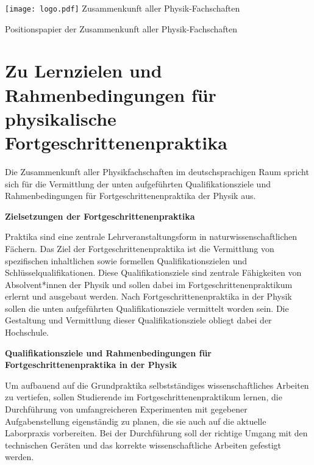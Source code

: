 ﻿\documentclass[DIV=calc]{scrartcl}
\begin{document}
    \hspace{0.87\textwidth}
    \begin{minipage}{120pt}
        \vspace{-1.8cm}
        \texttt{[image: logo.pdf]}
        \centering
        \small Zusammenkunft aller Physik-Fachschaften
    \end{minipage}
    \begin{center}
        \huge{Positionspapier der Zusammenkunft aller Physik-Fachschaften}\vspace{.25\baselineskip}\\
        \normalsize
    \end{center}
    \vspace{0.1cm}

\section*{Zu Lernzielen und Rahmenbedingungen für physikalische Fortgeschrittenenpraktika}


Die Zusammenkunft aller Physikfachschaften im deutschsprachigen Raum spricht sich für die Vermittlung der unten aufgeführten Qualifikationsziele und Rahmenbedingungen für Fortgeschrittenenpraktika der Physik aus.

\textbf{Zielsetzungen der Fortgeschrittenenpraktika}

Praktika sind eine zentrale Lehrveranstaltungsform in naturwissenschaftlichen Fächern. Das Ziel der Fortgeschrittenenpraktika ist die Vermittlung von spezifischen inhaltlichen sowie formellen Qualifikationszielen und Schlüsselqualifikationen. Diese Qualifikationsziele sind zentrale Fähigkeiten von Absolvent*innen der Physik und sollen dabei im Fortgeschrittenenpraktikum erlernt und ausgebaut werden. Nach  Fortgeschrittenenpraktika in der Physik sollen die unten aufgeführten Qualifikationsziele vermittelt worden sein. Die Gestaltung und Vermittlung dieser Qualifikationsziele obliegt dabei der Hochschule.

\textbf{Qualifikationsziele und Rahmenbedingungen für Fortgeschrittenenpraktika in der Physik}

Um aufbauend auf die Grundpraktika selbstständiges wissenschaftliches Arbeiten zu vertiefen, sollen Studierende im Fortgeschrittenenpraktikum lernen, die Durchführung von umfangreicheren Experimenten mit gegebener Aufgabenstellung eigenständig zu planen, die sie auch auf die aktuelle Laborpraxis vorbereiten. Bei der Durchführung soll der richtige Umgang mit den technischen Geräten und das korrekte wissenschaftliche Arbeiten gefestigt werden.\\[-0.25cm]
\end{document}
